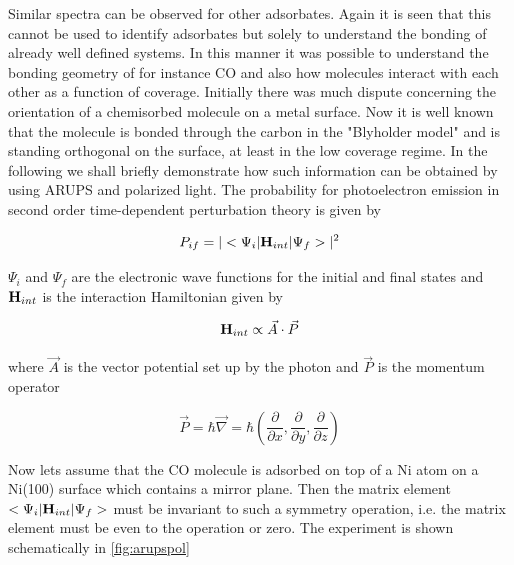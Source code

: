 Similar spectra can be observed for other adsorbates. Again it is seen that this cannot be used to identify adsorbates but solely to understand the bonding of already well defined systems. In this manner it was possible to understand the bonding geometry of for instance CO and also how molecules interact with each other as a function of coverage. Initially there was much dispute concerning the orientation of a chemisorbed molecule on a metal surface. Now it is well known that the molecule is bonded through the carbon in the "Blyholder  model"  and is standing orthogonal on the surface, at least in the low coverage regime. In the following we shall briefly demonstrate how such information can be obtained by using ARUPS and polarized light. The probability for photoelectron emission in second order time-dependent perturbation theory is given by

\begin{equation}
P_{if}=|<\Psi_{i}|{\bf H}_{int}|\Psi_f>|^2
\end{equation}

$\Psi_i$ and $\Psi_f$ are the electronic wave functions for the initial and final states and   ${\bf H}_{int}$ is the interaction Hamiltonian given by
 
\begin{equation}
{\bf H}_{int}\propto \vec{A}\cdot \vec{P}
\end{equation}
 
\noindent where $\vec{A}$ is the vector potential set up by the photon and $\vec{P}$ is the momentum operator

\begin{equation}
\vec{P}=\hbar \vec{\nabla}=\hbar \left(\frac{\partial}{\partial x}, \frac{\partial}{\partial y}, \frac{\partial}{\partial z}\right)
\end{equation}

Now lets assume that the CO molecule is adsorbed on top of a Ni atom on a Ni(100) surface which contains a mirror plane. Then the matrix element $<\Psi_i|{\bf H}_{int}|\Psi_f>$ must be invariant to such a symmetry operation, i.e. the matrix element must be even to the operation or zero. The experiment is shown schematically in \autoref{fig:arupspol}

